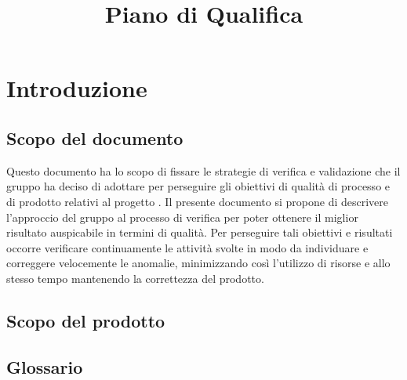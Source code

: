 

\usepackage{float}
\usepackage{varwidth}

\author{\MM}
\supervisor{\PB}
\dest{\TV, \RC, \ZU}
\title{Piano di Qualifica}

\newcommand\ambito[2]{%
	\multirow{#1}*{%
		\begin{varwidth}{3cm}%
		#2%
		\end{varwidth}}}

\newcommand{\nogloxy}[1]{#1}




\maketitle

\tableofcontents




\section{Introduzione}
	\subsection{Scopo del documento}
	Questo documento ha lo scopo di fissare le strategie di verifica e validazione che il gruppo \hx{} ha deciso di adottare per perseguire gli obiettivi di qualità di processo e di prodotto relativi al progetto \proj. Il presente documento si propone di descrivere l'approccio del gruppo al processo di verifica per poter ottenere il miglior risultato auspicabile in termini di qualità. Per perseguire tali obiettivi e risultati occorre verificare continuamente le attività svolte in modo da individuare e correggere velocemente le anomalie, minimizzando così l'utilizzo di risorse e allo stesso tempo mantenendo la correttezza del prodotto.

	\subsection{Scopo del prodotto}
	\scopo
	
	\subsection{Glossario}
	\presgloss
	
